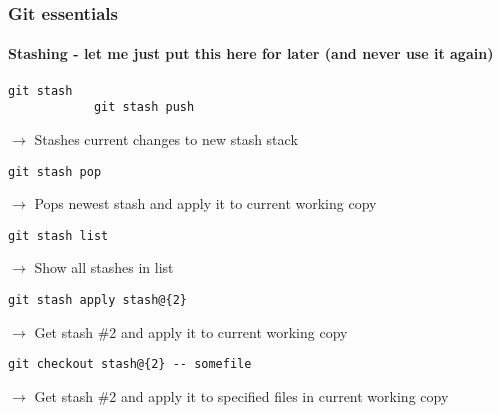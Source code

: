 \documentclass[aspectratio=169]{beamer}
\begin{document}
    \begin{frame}[fragile]
        \frametitle{Git essentials}
        \framesubtitle{Stashing - let me just put this here for later (and never use it again)}
        \begin{lstlisting}[gobble=12]
            git stash
            git stash push
        \end{lstlisting}
        $\rightarrow$ Stashes current changes to new stash stack
        \begin{lstlisting}[gobble=12]
            git stash pop
        \end{lstlisting}
        $\rightarrow$ Pops newest stash and apply it to current working copy
        \begin{lstlisting}[gobble=12]
            git stash list
        \end{lstlisting}
        $\rightarrow$ Show all stashes in list
        \begin{lstlisting}[gobble=12]
            git stash apply stash@{2}
        \end{lstlisting}
        $\rightarrow$ Get stash \#2 and apply it to current working copy
        \begin{lstlisting}[gobble=12]
            git checkout stash@{2} -- somefile
        \end{lstlisting}
        $\rightarrow$ Get stash \#2 and apply it to specified files in current working copy
    \end{frame}
\end{document}
